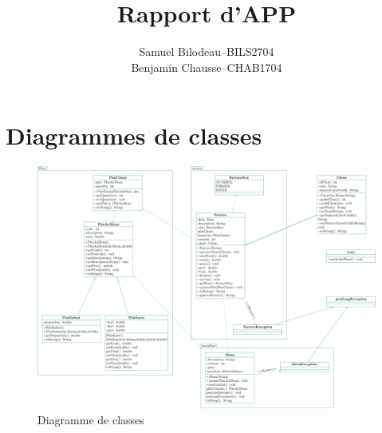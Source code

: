 \documentclass[a11paper, 11pt]{article}
\title{Rapport d'APP}
\author{
  \addtolength{\tabcolsep}{-0.4em}
  \begin{tabular}{rcl} %
  Samuel Bilodeau  & -- & BILS2704 \\ %
  Benjamin Chausse & -- & CHAB1704 \\
  \end{tabular}
}
\begin{document}
\maketitle
\newpage
\tableofcontents
\newpage
\section{Diagrammes de classes}

\begin{figure}[H]
  \centering
  \includegraphics[width=\textwidth]{uml/uml.pdf}
  \caption{Diagramme de classes}
  \label{fig:uml}
\end{figure}


\end{document}
